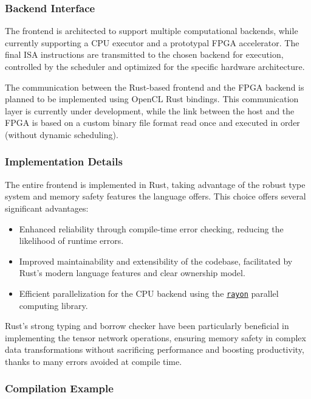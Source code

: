 \documentclass[12pt,oneside,a4paper]{article}
\begin{document}
\subsubsection{Backend Interface}

The frontend is architected to support multiple computational backends, while currently supporting a CPU executor and a prototypal FPGA accelerator. The final ISA instructions are transmitted to the chosen backend for execution, controlled by the scheduler and optimized for the specific hardware architecture.

The communication between the Rust-based frontend and the FPGA backend is planned to be implemented using OpenCL Rust bindings. This communication layer is currently under development, while the link between the host and the FPGA is based on a custom binary file format read once and executed in order (without dynamic scheduling).

\subsubsection{Implementation Details}

The entire frontend is implemented in Rust, taking advantage of the robust type system and memory safety features the language offers. This choice offers several significant advantages:

\begin{itemize}
    \item Enhanced reliability through compile-time error checking, reducing the likelihood of runtime errors.
    \item Improved maintainability and extensibility of the codebase, facilitated by Rust's modern language features and clear ownership model.
    \item Efficient parallelization for the CPU backend using the \href{https://github.com/rayon-rs/rayon}{\texttt{rayon}} parallel computing library.
\end{itemize}

Rust's strong typing and borrow checker have been particularly beneficial in implementing the tensor network operations, ensuring memory safety in complex data transformations without sacrificing performance and boosting productivity, thanks to many errors avoided at compile time.

\subsubsection{Compilation Example}
\end{document}
